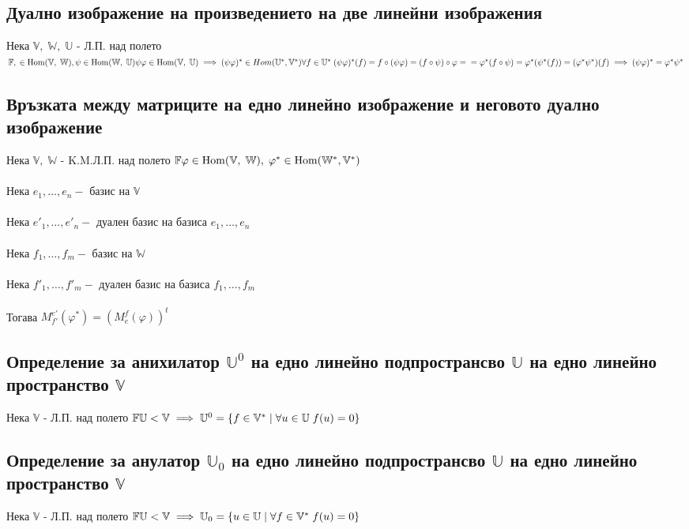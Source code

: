 \documentclass{article}
\newcommand{\V}{\mathbb{V}}
\newcommand{\F}{\mathbb{F}}
\newcommand{\W}{\mathbb{W}}
\newcommand{\UV}{\mathbb{U}}
\newcommand{\n}[1]{#1_1, \dots, #1_n}
\newcommand{\m}[1]{#1_1, \dots, #1_m}
\begin{document}
    \subsection{Дуално изображение на произведението на две линейни изображения}
    Нека \(\V, \; \W, \; \UV\) - Л.П. над полето \(\F, \; \in \mathrm{Hom}(\V, \; \W), \psi \in \mathrm{Hom}(\W, \; \UV) \\\\
    \psi\varphi \in \mathrm{Hom}(\V, \; \UV) \implies (\psi\varphi)^* \in Hom(\UV^*, \V^*) \\\\
    \forall f \in \UV^* \; (\psi\varphi)^*(f) = f \circ (\psi\varphi) = (f \circ \psi) \circ \varphi = \\\\
    = \varphi^*(f \circ \psi) = \varphi^*(\psi^*(f)) = (\varphi^*\psi^*)(f) \\\\
    \implies (\psi\varphi)^* = \varphi^*\psi^*\)
    \subsection{Връзката между матриците на едно линейно изображение и неговото дуално изображение}
    Нека \(\V, \; \W\) - K.M.Л.П. над полето \(\F \\\\
    \varphi \in \mathrm{Hom}(\V, \; \W), \; \varphi^* \in \mathrm{Hom}(\W^*, \V^*)\) \\\\
    Нека \(\n{e} - \text{ базис на } \V\) \\\\
    Нека \(\n{e'} - \text{ дуален базис на базиса } \n{e}\) \\\\
    Нека \(\m{f} - \text{ базис на } \W\) \\\\
    Нека \(\m{f'} - \text{ дуален базис на базиса } \m{f}\) \\\\
    Тогава \(M_{f'}^{e'}(\varphi^*) = (M_e^f(\varphi))^t\)
    \subsection{Определение за анихилатор \(\UV^0\) на едно линейно подпространсво \(\UV\) на едно линейно пространство \(\V\)}
    Нека \(\V\) - Л.П. над полето \(\F \\\\
    \UV < \V \implies \UV^0 = \{f \in \V^* \; | \; \forall u \in \UV \; f(u) = 0\}\)
    \subsection{Определение за анулатор \(\UV_0\) на едно линейно подпространсво \(\UV\) на едно линейно пространство \(\V\)}
    Нека \(\V\) - Л.П. над полето \(\F \\\\
    \UV < \V \implies \UV_0 = \{u \in \UV \; | \; \forall f \in \V^* \; f(u) = 0\}\)
\end{document}
